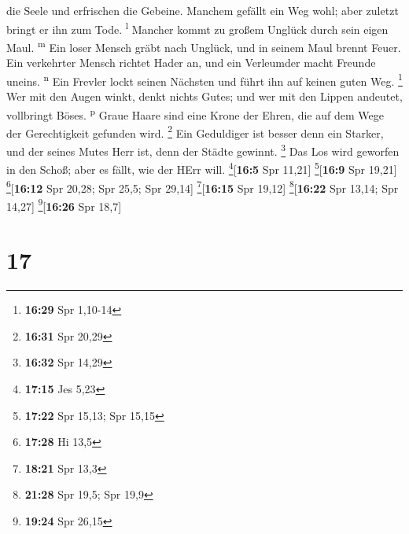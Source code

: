 die Seele und erfrischen die Gebeine.  Manchem gefällt
ein Weg wohl; aber zuletzt bringt er ihn zum Tode. \textsuperscript{l}
 Mancher kommt zu großem Unglück durch sein eigen Maul.
\textsuperscript{m}  Ein loser Mensch gräbt nach Unglück,
und in seinem Maul brennt Feuer.  Ein verkehrter Mensch
richtet Hader an, und ein Verleumder macht Freunde uneins.
\textsuperscript{n}  Ein Frevler lockt seinen Nächsten
und führt ihn auf keinen guten Weg. \footnote{\textbf{16:29} Spr 1,10-14}
 Wer mit den Augen winkt, denkt nichts Gutes; und wer mit
den Lippen andeutet, vollbringt Böses. \textsuperscript{p}
 Graue Haare sind eine Krone der Ehren, die auf dem Wege
der Gerechtigkeit gefunden wird. \footnote{\textbf{16:31} Spr 20,29}
 Ein Geduldiger ist besser denn ein Starker, und der
seines Mutes Herr ist, denn der Städte gewinnt. \footnote{\textbf{16:32}
  Spr 14,29}  Das Los wird geworfen in den Schoß; aber es
fällt, wie der HErr will. \footnote{\textbf{17:15} Jes 5,23}{[}\textbf{16:5}
Spr 11,21{]} \footnote{\textbf{17:22} Spr 15,13; Spr 15,15}{[}\textbf{16:9}
Spr 19,21{]} \footnote{\textbf{17:28} Hi 13,5}{[}\textbf{16:12} Spr
20,28; Spr 25,5; Spr 29,14{]} \footnote{\textbf{18:21} Spr 13,3}{[}\textbf{16:15}
Spr 19,12{]} \footnote{\textbf{21:28} Spr 19,5; Spr 19,9}{[}\textbf{16:22}
Spr 13,14; Spr 14,27{]} \footnote{\textbf{19:24} Spr 26,15}{[}\textbf{16:26}
Spr 18,7{]}

\hypertarget{section-16}{%
\section{17}\label{section-16}}

